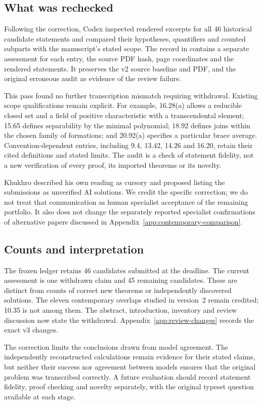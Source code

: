 \subsection{What was rechecked}

Following the correction, Codex inspected rendered excerpts for all
46 historical candidate statements and compared their hypotheses,
quantifiers and counted subparts with the manuscript's stated scope.
The record in  contains a separate
assessment for each entry, the source PDF hash, page coordinates and
the rendered statements. It preserves the v2 source baseline and PDF,
and the original erroneous audit as evidence of the review failure.

This pass found no further transcription mismatch requiring withdrawal.
Existing scope qualifications remain explicit. For example, 16.28(a)
allows a reducible closed set and a field of positive characteristic
with a transcendental element; 15.65 defines separability by the minimal
polynomial; 18.92 defines joins within the chosen family of formations;
and 20.92(a) specifies a particular brace average. Convention-dependent
entries, including 9.4, 13.42, 14.26 and 16.20, retain their cited
definitions and stated limits. The audit is a check of statement fidelity,
not a new verification of every proof, its imported theorems or its novelty.

Khukhro described his own reading as cursory and proposed listing the
submissions as unverified AI solutions. We credit the specific correction;
we do not treat that communication as human specialist acceptance of
the remaining portfolio. It also does not change the separately reported
specialist confirmations of alternative papers discussed in Appendix~\ref{app:contemporary-comparison}.

\subsection{Counts and interpretation}

The frozen ledger retains 46 candidates submitted at the deadline.
The current assessment is one withdrawn claim and 45 remaining candidates.
These are distinct from counts of correct new theorems or independently
discovered solutions. The eleven contemporary overlaps studied in
version~2 remain credited; 10.35 is not among them. The abstract,
introduction, inventory and review discussion now state the withdrawal.
Appendix~\ref{app:review-changes} records the exact v3 changes.

The correction limits the conclusions drawn from model agreement.
The independently reconstructed calculations remain evidence for their
stated claims, but neither their success nor agreement between models
ensures that the original problem was transcribed correctly. A future
evaluation should record statement fidelity, proof checking and novelty
separately, with the original typeset question available at each stage.
